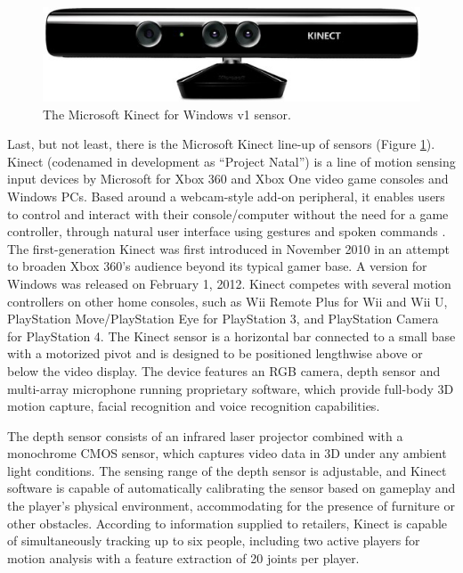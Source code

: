 \documentclass[a4paper, 12pt]{amsart}
\begin{document}
\begin{figure}[htb]
\centering
\includegraphics[width=.9\linewidth]{fig_microsoft_kinect_v1}
\caption{The Microsoft Kinect for Windows v1 sensor.}
\label{fig:microsoft_kinect_v1}
\end{figure}

Last, but not least, there is the Microsoft Kinect line-up of sensors (Figure \ref{fig:microsoft_kinect_v1}). Kinect (codenamed in development as ``Project Natal'') is a line of motion sensing input devices by Microsoft for Xbox 360 and Xbox One video game consoles and Windows PCs. Based around a webcam-style add-on peripheral, it enables users to control and interact with their console/computer without the need for a game controller, through natural user interface using gestures and spoken commands \cite{bib_microsoft_kinect_v1_sdk}. The first-generation Kinect was first introduced in November 2010 in an attempt to broaden Xbox 360's audience beyond its typical gamer base. A version for Windows was released on February 1, 2012. Kinect competes with several motion controllers on other home consoles, such as Wii Remote Plus for Wii and Wii U, PlayStation Move/PlayStation Eye for PlayStation 3, and PlayStation Camera for PlayStation 4. The Kinect sensor is a horizontal bar connected to a small base with a motorized pivot and is designed to be positioned lengthwise above or below the video display. The device features an RGB camera, depth sensor and multi-array microphone running proprietary software, which provide full-body 3D motion capture, facial recognition and voice recognition capabilities.

The depth sensor consists of an infrared laser projector combined with a monochrome CMOS sensor, which captures video data in 3D under any ambient light conditions. The sensing range of the depth sensor is adjustable, and Kinect software is capable of automatically calibrating the sensor based on gameplay and the player's physical environment, accommodating for the presence of furniture or other obstacles. According to information supplied to retailers, Kinect is capable of simultaneously tracking up to six people, including two active players for motion analysis with a feature extraction of 20 joints per player.
\end{document}
